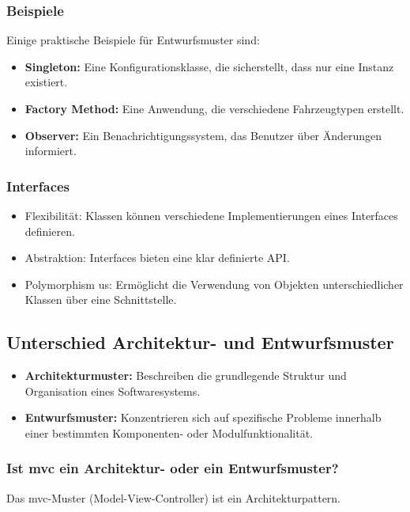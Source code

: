 \documentclass[main.tex]{subfiles}
\begin{document}
\subsubsection*{Beispiele}
Einige praktische Beispiele für \gls{Entwurfsmuster} sind:
\begin{itemize}
    \item \textbf{Singleton:} Eine Konfigurationsklasse, die sicherstellt, dass nur eine Instanz existiert.
    \item \textbf{Factory Method:} Eine Anwendung, die verschiedene Fahrzeugtypen erstellt.
    \item \textbf{Observer:} Ein Benachrichtigungssystem, das Benutzer über Änderungen informiert.
\end{itemize}

\subsubsection*{\glspl{Interface}}
\begin{itemize}
    \item Flexibilität: Klassen können verschiedene Implementierungen eines \glspl{Interface} definieren.
    \item Abstraktion: \glspl{Interface} bieten eine klar definierte API.
    \item \gls{Polymorphism} us: Ermöglicht die Verwendung von Objekten unterschiedlicher Klassen über eine Schnittstelle.
\end{itemize}

\subsection{Unterschied Architektur- und \gls{Entwurfsmuster}}
\begin{itemize}
    \item \textbf{\gls{Architekturmuster}:} Beschreiben die grundlegende Struktur und Organisation eines Softwaresystems.
    \item \textbf{\gls{Entwurfsmuster}:} Konzentrieren sich auf spezifische Probleme innerhalb einer bestimmten Komponenten- oder Modulfunktionalität.
\end{itemize}

\subsubsection*{Ist \gls{mvc} ein Architektur- oder ein \gls{Entwurfsmuster}?}
Das \gls{mvc}-Muster (Model-View-Controller) ist ein Architekturpattern.
\end{document}
